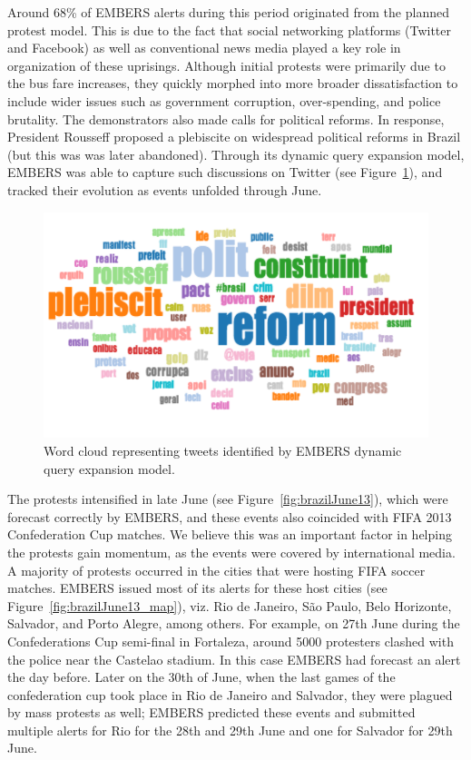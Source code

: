 \documentclass[11pt,a4paper,extrafontsizes,oneside]{article}
\begin{document}
Around 68\% of EMBERS alerts during this period originated from
the planned protest model.
This is due to the fact that
social networking
platforms (Twitter and Facebook) as well as conventional news media played a key
role in organization of these uprisings. Although initial protests were
primarily due to the bus fare increases, they quickly morphed into
more broader dissatisfaction to include wider issues such as
government corruption, over-spending, and police brutality. The
demonstrators also made calls for political reforms. In response, President
Rousseff proposed a plebiscite on widespread political reforms in
Brazil (but this was was later abandoned). Through its dynamic query expansion model,
EMBERS was able to capture such discussions on Twitter
(see Figure~\ref{fig:brazilJune13_wordCloud}), and tracked their evolution as events
unfolded through June.

\begin{figure} \centering
\includegraphics[width=.8\columnwidth]{brazilJune13_wordCloud}
\caption{Word cloud representing tweets identified by EMBERS dynamic query expansion model.}
\label{fig:brazilJune13_wordCloud}
\end{figure}

The protests intensified in late June (see Figure~\ref{fig:brazilJune13}), which were
forecast correctly by EMBERS, and these events
also coincided with FIFA 2013 Confederation Cup matches. We believe this was an important factor in helping
the protests gain momentum,
as the events were covered by international media. A majority of protests
occurred in the cities that were hosting FIFA soccer matches.
EMBERS issued most of its alerts for these host cities (see
Figure~\ref{fig:brazilJune13_map}), viz.
Rio de Janeiro, São Paulo,
Belo Horizonte, Salvador, and Porto Alegre,
among others. For example, on 27th June during the Confederations Cup
semi-final in Fortaleza, around 5000 protesters clashed with the police
near the Castelao stadium. In this case EMBERS had forecast an alert the
day before. Later on the 30th of June, when the last games of the
confederation cup took place in Rio de Janeiro and Salvador, they
were plagued by mass protests as well; EMBERS predicted these events and
submitted multiple alerts for Rio for the 28th and 29th June and one for
Salvador for 29th June.
\end{document}
